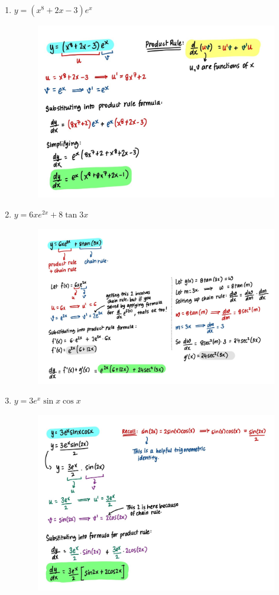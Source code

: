 \documentclass{article}
\begin{document}
\begin{enumerate}
    \item $y = (x^8+2x-3)e^x$
    \begin{figure}[H]
        \centering
        \includegraphics[width= 0.6\linewidth]{Q1.1.jpg}
        \label{fig:Q1.1}
    \end{figure}
    \item $y = 6xe^{2x}+8\tan3x$
    \begin{figure}[H]
        \centering
        \includegraphics[width= 0.95\linewidth]{Q1.2.jpg}
        \label{fig:Q1.2}
    \end{figure}
    \item $y = 3e^x\sin x \cos x$
    \begin{figure}[H]
        \centering
        \includegraphics[width= 0.9\linewidth]{Q1.3.jpg}

\end{figure}
\end{enumerate}
\end{document}
